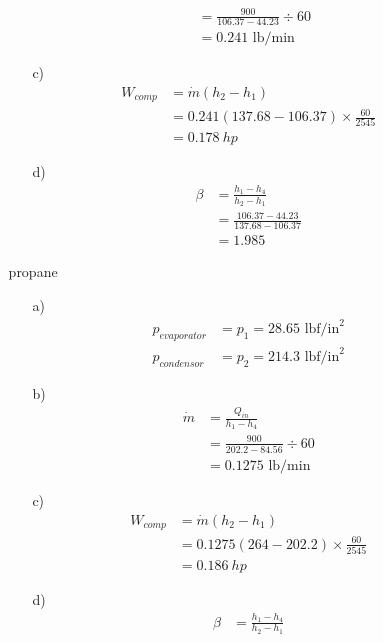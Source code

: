 \documentclass{article}
\begin{document}
\begin{itemize}
\begin{itemize}
\begin{itemize}
\begin{align*}
                &=\frac{900}{106.37-44.23}\div 60\\
                &=0.241 \text{ lb/min}
            \end{align*}
            \item [c)]
            \begin{align*}
                W_{comp}&=\dot m (h_2-h_1)\\
                &=0.241(137.68-106.37)\times \frac{60}{2545}\\
                &=0.178  \ hp
            \end{align*}
            \item [d)]
            \begin{align*}
                \beta &= \frac{h_1-h_4}{h_2-h_1}\\
                &=\frac{106.37-44.23}{137.68-106.37}\\
                &=1.985
            \end{align*}
        \end{itemize}
        \item [propane]
        \begin{itemize}
            \item [a)]
            \begin{align*}
                p_{evaporator}&=p_1=28.65 \text{ lbf/in}^2\\
                p_{condensor}&=p_2=214.3 \text{ lbf/in}^2
            \end{align*}
            \item [b)]
            \begin{align*}
                \dot{m}&=\frac{Q_{in}}{h_1-h_4}\\
                &=\frac{900}{202.2-84.56}\div 60\\
                &=0.1275 \text{ lb/min}
            \end{align*}
            \item [c)]
            \begin{align*}
                W_{comp}&=\dot m (h_2-h_1)\\
                &=0.1275(264-202.2)\times \frac{60}{2545}\\
                &=0.186 \ hp
            \end{align*}
            \item [d)]
            \begin{align*}
                \beta &= \frac{h_1-h_4}{h_2-h_1}\\

\end{align*}
\end{itemize}
\end{itemize}
\end{itemize}
\end{document}
